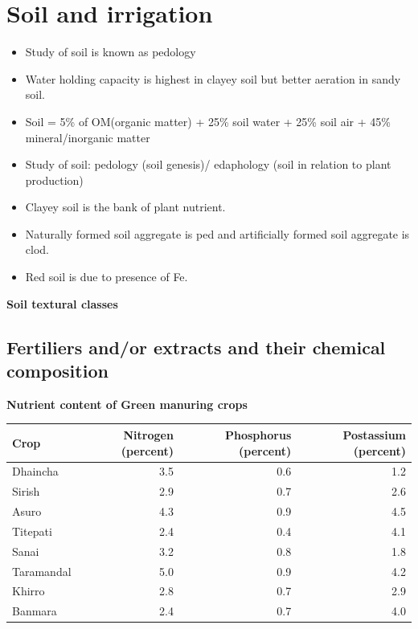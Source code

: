 \documentclass[
  openany]{book}
\providecommand{\tightlist}{%
  \setlength{\itemsep}{0pt}\setlength{\parskip}{0pt}}
\begin{document}
\hypertarget{soil-and-irrigation}{%
\chapter{Soil and irrigation}\label{soil-and-irrigation}}

\begin{itemize}
\tightlist
\item
  Study of soil is known as pedology
\item
  Water holding capacity is highest in clayey soil but better aeration in sandy soil.
\item
  Soil = 5\% of OM(organic matter) + 25\% soil water + 25\% soil air + 45\% mineral/inorganic matter
\item
  Study of soil: pedology (soil genesis)/ edaphology (soil in relation to plant production)
\item
  Clayey soil is the bank of plant nutrient.
\item
  Naturally formed soil aggregate is ped and artificially formed soil aggregate is clod.
\item
  Red soil is due to presence of Fe.
\end{itemize}

\textbf{Soil textural classes}

\hypertarget{fertiliers-andor-extracts-and-their-chemical-composition}{%
\section{Fertiliers and/or extracts and their chemical composition}\label{fertiliers-andor-extracts-and-their-chemical-composition}}

\textbf{Nutrient content of Green manuring crops}

\begin{tabular}{lrrr}
\toprule
Crop & Nitrogen (percent) & Phosphorus (percent) & Postassium (percent)\\
\midrule
Dhaincha & 3.5 & 0.6 & 1.2\\
Sirish & 2.9 & 0.7 & 2.6\\
Asuro & 4.3 & 0.9 & 4.5\\
Titepati & 2.4 & 0.4 & 4.1\\
Sanai & 3.2 & 0.8 & 1.8\\
\addlinespace
Taramandal & 5.0 & 0.9 & 4.2\\
Khirro & 2.8 & 0.7 & 2.9\\
Banmara & 2.4 & 0.7 & 4.0\\
\bottomrule
\end{tabular}
\end{document}
